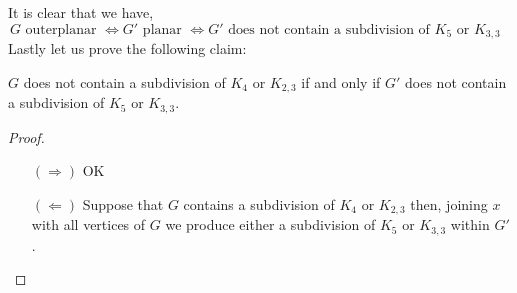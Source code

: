 It is clear that we have,
$$ G \text{ outerplanar } \Leftrightarrow G' \text{ planar } \Leftrightarrow G' \text{ does not contain a subdivision of $K_5$ or $K_{3,3}$ }$$
Lastly let us prove the following claim:
\begin{claim}
    $G$ does not contain a subdivision of $K_4$ or $K_{2,3}$ if and only if $G'$ does not contain a subdivision of $K_5$ or $K_{3,3}$.
\end{claim}
\begin{proof}
    \begin{itemize}
        \item[$(\Rightarrow)$] OK
        \item[$(\Leftarrow)$] Suppose that $G$ contains a subdivision of $K_4$ or $K_{2,3}$ then, joining $x$ with all vertices of $G$ we produce either a subdivision of $K_5$ or $K_{3,3}$ within $G'$.
    \end{itemize}
\end{proof}
